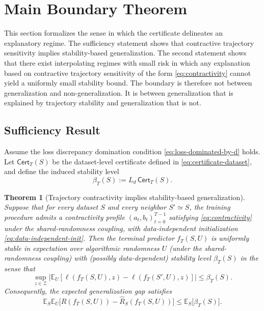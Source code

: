 \documentclass{article}
\newtheorem{theorem}{Theorem}[section]
\numberwithin{equation}{section}
\begin{document}
\section{Main Boundary Theorem}
\label{sec:boundary}

This section formalizes the sense in which the certificate delineates an explanatory regime. The sufficiency statement shows that contractive trajectory sensitivity implies stability-based generalization. The second statement shows that there exist interpolating regimes with small risk in which any explanation based on contractive trajectory sensitivity of the form \eqref{eq:contractivity} cannot yield a uniformly small stability bound. The boundary is therefore not between generalization and non-generalization. It is between generalization that is explained by trajectory stability and generalization that is not.

\subsection{Sufficiency Result}
\label{subsec:sufficiency}

Assume the loss discrepancy domination condition \eqref{eq:loss-dominated-by-d} holds. Let $\mathsf{Cert}_T(S)$ be the dataset-level certificate defined in \eqref{eq:certificate-dataset}, and define the induced stability level
\[
\beta_T(S):= L_d\,\mathsf{Cert}_T(S).
\]

\begin{theorem}[Trajectory contractivity implies stability-based generalization]
	\label{thm:sufficiency}
	Suppose that for every dataset $S$ and every neighbor $S'\simeq S$, the training procedure admits a contractivity profile $(a_t,b_t)_{t=0}^{T-1}$ satisfying \eqref{eq:contractivity} under the shared-randomness coupling, with data-independent initialization \eqref{eq:data-independent-init}. 	Then the terminal predictor $f_T(S,U)$ is uniformly stable in expectation over algorithmic randomness $U$ (under the shared-randomness coupling) with (possibly data-dependent) stability level $\beta_T(S)$ in the sense that
	\[
	\sup_{z\in\mathcal{Z}}
	\Big|
	\mathbb{E}_U[\ell(f_T(S,U),z)-\ell(f_T(S',U),z)]
	\Big|
	\le \beta_T(S).
	\]
	Consequently, the expected generalization gap satisfies
	\[
	\mathbb{E}_{S}\mathbb{E}_{U}\big[ R(f_T(S,U))-\widehat{R}_S(f_T(S,U))\big]
	\le \mathbb{E}_{S}\big[\beta_T(S)\big].
	\]
\end{theorem}
\end{document}
